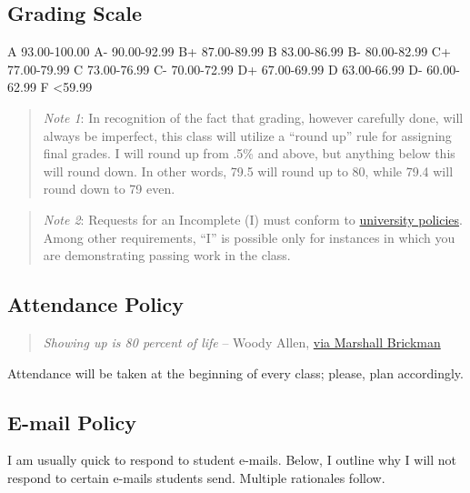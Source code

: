 \documentclass[11pt,]{article}
\begin{document}
\hypertarget{grading-scale}{%
\subsection{Grading Scale}\label{grading-scale}}

A 93.00-100.00 \textbar{} A- 90.00-92.99 B+ 87.00-89.99 \textbar{} B
83.00-86.99 \textbar{} B- 80.00-82.99 C+ 77.00-79.99 \textbar{} C
73.00-76.99 \textbar{} C- 70.00-72.99 D+ 67.00-69.99 \textbar{} D
63.00-66.99 \textbar{} D- 60.00-62.99 F \textless59.99

\begin{quote}
\emph{Note 1}: In recognition of the fact that grading, however
carefully done, will always be imperfect, this class will utilize a
``round up'' rule for assigning final grades. I will round up from .5\%
and above, but anything below this will round down. In other words, 79.5
will round up to 80, while 79.4 will round down to 79 even.
\end{quote}

\begin{quote}
\emph{Note 2}: Requests for an Incomplete (I) must conform to
\href{https://bit.ly/3bDxwZi}{university policies}. Among other
requirements, ``I'' is possible only for instances in which you are
demonstrating passing work in the class.
\end{quote}

\hypertarget{attendance-policy}{%
\subsection{Attendance Policy}\label{attendance-policy}}

\begin{quote}
\emph{Showing up is 80 percent of life} -- Woody Allen,
\href{http://quoteinvestigator.com/2013/06/10/showing-up/\#note-6553-1}{via
Marshall Brickman}
\end{quote}

Attendance will be taken at the beginning of every class; please, plan
accordingly.

\hypertarget{e-mail-policy}{%
\subsection{E-mail Policy}\label{e-mail-policy}}

I am usually quick to respond to student e-mails. Below, I outline why I
will not respond to certain e-mails students send. Multiple rationales
follow.
\end{document}

